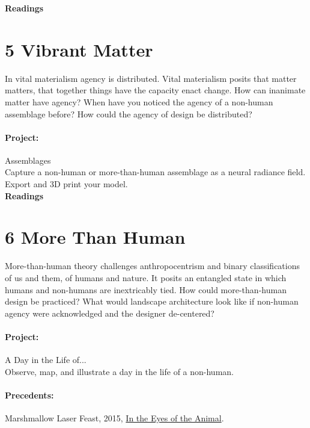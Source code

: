 \documentclass[11pt,article,oneside]{memoir}
\begin{document}
\clearpage

\noindent
\textbf{Readings}
\nocite{*}
\setlength{}
\printbibliography[keyword=xenofeminism, heading=none]

\section{5 Vibrant Matter}

In vital materialism agency is distributed. 
Vital materialism 
posits that matter matters,
that together things 
have the capacity enact change.
How can inanimate matter have agency? 
When have you noticed the agency of a non-human assemblage before?
How could the agency of design be distributed? 

\paragraph{Project:} Assemblages \\

\noindent
Capture a non-human or more-than-human assemblage 
as a neural radiance field. 
Export and 3D print your model. 
\\

\noindent
\textbf{Readings}
\nocite{*}
\setlength{}
\printbibliography[keyword=vibrant-matter, heading=none]

\section{6 More Than Human}  

More-than-human theory
challenges anthropocentrism and
binary classifications
of us and them,
of humans and nature.
It posits an entangled state
in which humans and non-humans
are inextricably tied.
How could more-than-human design be practiced?
What would landscape architecture look like 
if non-human agency were acknowledged
and the designer de-centered? 

\paragraph{Project:} A Day in the Life of... \\

\noindent
Observe, map, and illustrate a day in the life of a non-human.

\paragraph{Precedents:} 
Marshmallow Laser Feast, 2015, \href{http://intheeyesoftheanimal.com/}{In the Eyes of the Animal}.
\\
\end{document}

